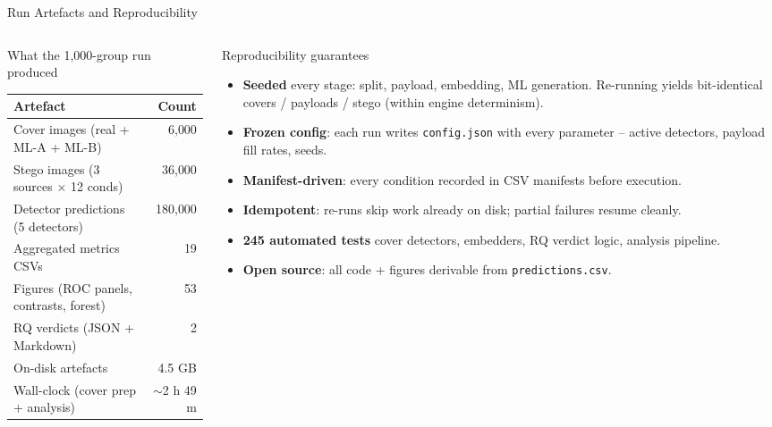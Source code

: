 \documentclass[aspectratio=169,11pt]{beamer}
\begin{document}
\begin{frame}{Run Artefacts and Reproducibility}
\scriptsize
\begin{columns}[T]
\begin{column}{0.49\textwidth}
\begin{block}{What the 1{,}000-group run produced}
\centering\renewcommand{\arraystretch}{1.05}
\begin{tabular}{l@{\hskip 6pt}r}
\textbf{Artefact} & \textbf{Count} \\
\midrule
Cover images (real + ML-A + ML-B) & 6{,}000 \\
Stego images (3 sources $\times$ 12 conds) & 36{,}000 \\
Detector predictions (5 detectors) & 180{,}000 \\
Aggregated metrics CSVs & 19 \\
Figures (ROC panels, contrasts, forest) & 53 \\
RQ verdicts (JSON + Markdown) & 2 \\
\midrule
On-disk artefacts & 4.5 GB \\
Wall-clock (cover prep + analysis) & $\sim$2 h 49 m \\
\end{tabular}
\end{block}
\end{column}
\begin{column}{0.49\textwidth}
\begin{block}{Reproducibility guarantees}
\begin{itemize}\setlength{\itemsep}{1pt}
\item \textbf{Seeded} every stage: split, payload, embedding, ML generation. Re-running yields bit-identical covers / payloads / stego (within engine determinism).
\item \textbf{Frozen config}: each run writes \texttt{config.json} with every parameter -- active detectors, payload fill rates, seeds.
\item \textbf{Manifest-driven}: every condition recorded in CSV manifests before execution.
\item \textbf{Idempotent}: re-runs skip work already on disk; partial failures resume cleanly.
\item \textbf{245 automated tests} cover detectors, embedders, RQ verdict logic, analysis pipeline.
\item \textbf{Open source}: all code + figures derivable from \texttt{predictions.csv}.
\end{itemize}
\end{block}
\end{column}
\end{columns}
\end{frame}
\end{document}
